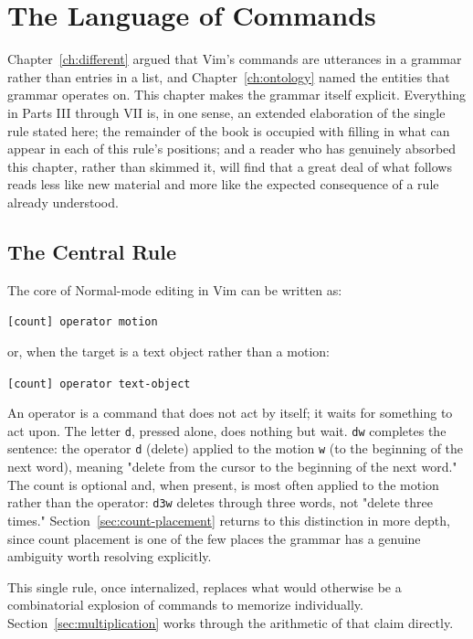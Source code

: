 \chapter{The Language of Commands}
\label{ch:language}

Chapter~\ref{ch:different} argued that Vim's commands are utterances in a grammar rather than entries in a list, and Chapter~\ref{ch:ontology} named the entities that grammar operates on. This chapter makes the grammar itself explicit. Everything in Parts III through VII is, in one sense, an extended elaboration of the single rule stated here; the remainder of the book is occupied with filling in what can appear in each of this rule's positions; and a reader who has genuinely absorbed this chapter, rather than skimmed it, will find that a great deal of what follows reads less like new material and more like the expected consequence of a rule already understood.

\section{The Central Rule}

The core of Normal-mode editing in Vim can be written as:

\begin{center}
\texttt{[count] operator motion}
\end{center}

or, when the target is a text object rather than a motion:

\begin{center}
\texttt{[count] operator text-object}
\end{center}

An operator is a command that does not act by itself; it waits for something to act upon. The letter \texttt{d}, pressed alone, does nothing but wait. \texttt{dw} completes the sentence: the operator \texttt{d} (delete) applied to the motion \texttt{w} (to the beginning of the next word), meaning "delete from the cursor to the beginning of the next word." The count is optional and, when present, is most often applied to the motion rather than the operator: \texttt{d3w} deletes through three words, not "delete three times." Section~\ref{sec:count-placement} returns to this distinction in more depth, since count placement is one of the few places the grammar has a genuine ambiguity worth resolving explicitly.

This single rule, once internalized, replaces what would otherwise be a combinatorial explosion of commands to memorize individually. Section~\ref{sec:multiplication} works through the arithmetic of that claim directly.

